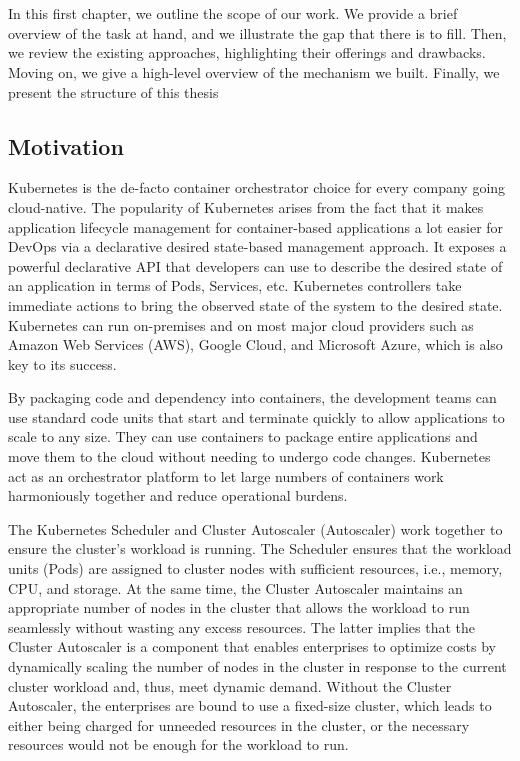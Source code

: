 \chapter{\introname} \label{chapter:introduction}


In this first chapter, we outline the scope of our work. We provide a brief
overview of the task at hand, and we illustrate the gap that there is to fill.
Then, we review the existing approaches, highlighting their offerings and
drawbacks. Moving on, we give a high-level overview of the mechanism we built.
Finally, we present the structure of this thesis


\section{Motivation} \label{section:intro_motivation}


Kubernetes is the de-facto container orchestrator choice for every company going
cloud-native. The popularity of Kubernetes arises from the fact that it makes
application lifecycle management for container-based applications a lot easier
for DevOps via a declarative desired state-based management approach. It exposes
a powerful declarative API that developers can use to describe the desired state
of an application in terms of Pods, Services, etc. Kubernetes controllers take
immediate actions to bring the observed state of the system to the desired
state. Kubernetes can run on-premises and on most major cloud providers such as
Amazon Web Services (AWS), Google Cloud, and Microsoft Azure, which is also key
to its success.

By packaging code and dependency into containers, the development teams can use
standard code units that start and terminate quickly to allow applications to
scale to any size. They can use containers to package entire applications and
move them to the cloud without needing to undergo code changes. Kubernetes act
as an orchestrator platform to let large numbers of containers work harmoniously
together and reduce operational burdens.

The Kubernetes Scheduler and Cluster Autoscaler (Autoscaler) work together to
ensure the cluster's workload is running. The Scheduler ensures that the
workload units (Pods) are assigned to cluster nodes with sufficient resources,
i.e., memory, CPU, and storage. At the same time, the Cluster Autoscaler
maintains an appropriate number of nodes in the cluster that allows the workload
to run seamlessly without wasting any excess resources. The latter implies that
the Cluster Autoscaler is a component that enables enterprises to optimize costs
by dynamically scaling the number of nodes in the cluster in response to the
current cluster workload and, thus, meet dynamic demand. Without the Cluster
Autoscaler, the enterprises are bound to use a fixed-size cluster, which leads
to either being charged for unneeded resources in the cluster, or the necessary
resources would not be enough for the workload to run.

